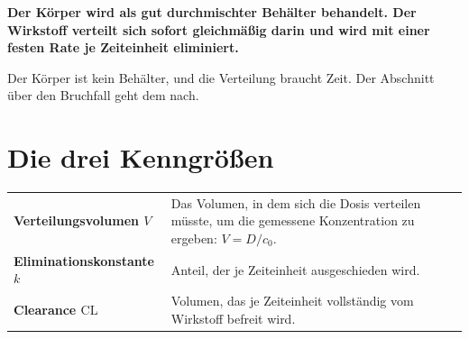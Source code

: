 \begin{merksatz}
\begin{center}
\begin{minipage}{0.9\textwidth}
\textbf{Der Körper wird als  gut durchmischter Behälter behandelt. Der Wirkstoff verteilt sich sofort gleichmäßig darin und wird mit einer festen Rate je Zeiteinheit eliminiert.}
\end{minipage}
\end{center}

\begin{center}
\end{center}

Der Körper ist kein Behälter, und die Verteilung braucht Zeit. Der Abschnitt über den Bruchfall geht dem nach.

\begin{center}
\begin{minipage}{0.88\textwidth}
\end{minipage}
\end{center}
\end{merksatz}

\section{Die drei Kenngrößen}

\begin{definition}
\begin{center}
{\small
\renewcommand{\arraystretch}{1.6}
\begin{tabular}{@{}P{3.4cm}P{5.2cm}@{}}
\toprule
\textbf{Verteilungs\-volumen $V$} & Das Volumen, in dem sich die Dosis verteilen müsste, um die gemessene Konzentration zu ergeben: $V = D/c_0$.\\
\textbf{Eliminations\-konstante $k$} & Anteil, der je Zeiteinheit ausgeschieden wird.\\
\textbf{Clearance $\mathrm{CL}$} & Volumen, das je Zeiteinheit vollständig vom Wirkstoff befreit wird.\\
\bottomrule
\end{tabular}}
\end{center}
\end{definition}

